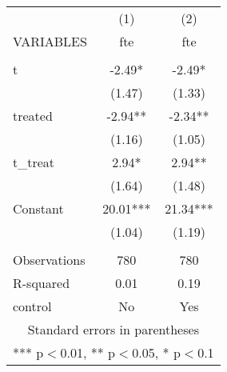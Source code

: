 \documentclass[]{article}
\begin{document}
\begin{tabular}{lcc} \hline
 & (1) & (2) \\
VARIABLES & fte & fte \\ \hline
 &  &  \\
t & -2.49* & -2.49* \\
 & (1.47) & (1.33) \\
treated & -2.94** & -2.34** \\
 & (1.16) & (1.05) \\
t\_treat & 2.94* & 2.94** \\
 & (1.64) & (1.48) \\
Constant & 20.01*** & 21.34*** \\
 & (1.04) & (1.19) \\
 &  &  \\
Observations & 780 & 780 \\
R-squared & 0.01 & 0.19 \\
 control & No & Yes \\ \hline
\multicolumn{3}{c}{ Standard errors in parentheses} \\
\multicolumn{3}{c}{ *** p$<$0.01, ** p$<$0.05, * p$<$0.1} \\
\end{tabular}
\end{document}
